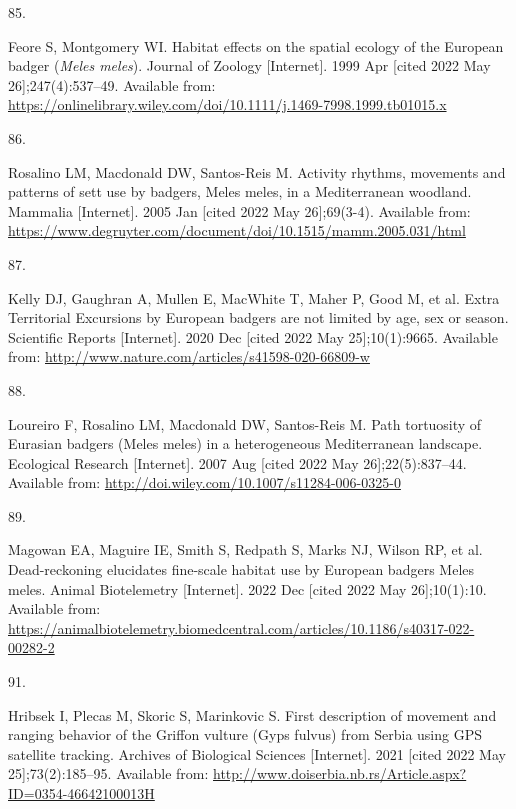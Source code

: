 \documentclass[10pt,a4paper]{article}
\newlength{\cslhangindent}
\newlength{\csllabelwidth}
\newlength{\cslentryspacingunit} %
\newenvironment{CSLReferences}[2] %
 {%
  \setlength{\parindent}{0pt}
  \ifodd #1
  \let\oldpar\par
  \def\par{\hangindent=\cslhangindent\oldpar}
  \fi
  \setlength{\parskip}{#2\cslentryspacingunit}
 }%
 {}
\newcommand{\CSLLeftMargin}[1]{\parbox[t]{\csllabelwidth}{#1}}
\newcommand{\CSLRightInline}[1]{\parbox[t]{\linewidth - \csllabelwidth}{#1}\break}
\begin{document}
\begin{CSLReferences}{0}{0}
\leavevmode\hypertarget{ref-feore_habitat_1999}{}%
\CSLLeftMargin{85. }
\CSLRightInline{Feore S, Montgomery WI. Habitat effects on the spatial ecology of the {European} badger (\emph{{Meles} meles}). Journal of Zoology {[}Internet{]}. 1999 Apr {[}cited 2022 May 26{]};247(4):537--49. Available from: \url{https://onlinelibrary.wiley.com/doi/10.1111/j.1469-7998.1999.tb01015.x}}

\leavevmode\hypertarget{ref-rosalino_activity_2005}{}%
\CSLLeftMargin{86. }
\CSLRightInline{Rosalino LM, Macdonald DW, Santos-Reis M. Activity rhythms, movements and patterns of sett use by badgers, {Meles} meles, in a {Mediterranean} woodland. Mammalia {[}Internet{]}. 2005 Jan {[}cited 2022 May 26{]};69(3-4). Available from: \url{https://www.degruyter.com/document/doi/10.1515/mamm.2005.031/html}}

\leavevmode\hypertarget{ref-kelly_extra_2020}{}%
\CSLLeftMargin{87. }
\CSLRightInline{Kelly DJ, Gaughran A, Mullen E, MacWhite T, Maher P, Good M, et al. Extra {Territorial} {Excursions} by {European} badgers are not limited by age, sex or season. Scientific Reports {[}Internet{]}. 2020 Dec {[}cited 2022 May 25{]};10(1):9665. Available from: \url{http://www.nature.com/articles/s41598-020-66809-w}}

\leavevmode\hypertarget{ref-loureiro_path_2007}{}%
\CSLLeftMargin{88. }
\CSLRightInline{Loureiro F, Rosalino LM, Macdonald DW, Santos-Reis M. Path tortuosity of {Eurasian} badgers ({Meles} meles) in a heterogeneous {Mediterranean} landscape. Ecological Research {[}Internet{]}. 2007 Aug {[}cited 2022 May 26{]};22(5):837--44. Available from: \url{http://doi.wiley.com/10.1007/s11284-006-0325-0}}

\leavevmode\hypertarget{ref-magowan_dead-reckoning_2022}{}%
\CSLLeftMargin{89. }
\CSLRightInline{Magowan EA, Maguire IE, Smith S, Redpath S, Marks NJ, Wilson RP, et al. Dead-reckoning elucidates fine-scale habitat use by {European} badgers {Meles} meles. Animal Biotelemetry {[}Internet{]}. 2022 Dec {[}cited 2022 May 26{]};10(1):10. Available from: \url{https://animalbiotelemetry.biomedcentral.com/articles/10.1186/s40317-022-00282-2}}

\leavevmode\hypertarget{ref-hribsek_first_2021}{}%
\CSLLeftMargin{91. }
\CSLRightInline{Hribsek I, Plecas M, Skoric S, Marinkovic S. First description of movement and ranging behavior of the {Griffon} vulture ({Gyps} fulvus) from {Serbia} using {GPS} satellite tracking. Archives of Biological Sciences {[}Internet{]}. 2021 {[}cited 2022 May 25{]};73(2):185--95. Available from: \url{http://www.doiserbia.nb.rs/Article.aspx?ID=0354-46642100013H}}


\end{CSLReferences}
\end{document}
